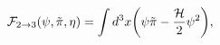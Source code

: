 \begin{equation}
{\cal F}_{2\to 3} ( \psi, \tilde{\pi}, \eta) = \int d^{3} x \biggl( \psi \tilde{\pi}
 - \frac{{\cal H}}{2} \psi^2\biggr),
\label{2to3}
\end{equation}

